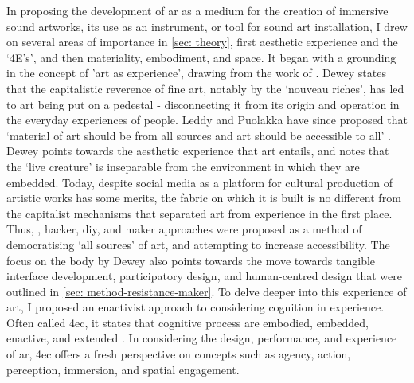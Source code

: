 In proposing the development of \gls{ar} as a medium for the creation of immersive sound artworks, its use as an instrument, or tool for sound art installation, I drew on several areas of importance in \autoref{sec: theory}, first aesthetic experience and the `4E's', and then materiality, embodiment, and space. It began with a grounding in the concept of 'art as experience', drawing from the work of \citep{dewey1934}. Dewey states that the capitalistic reverence of fine art, notably by the `nouveau riches', has led to art being put on a pedestal - disconnecting it from its origin and operation in the everyday experiences of people. Leddy and Puolakka have since proposed that `material of art should be from all sources and art should be accessible to all' \citeyearpar{leddy2021}. Dewey points towards the aesthetic experience that art entails, and notes that the `live creature' is inseparable from the environment in which they are embedded. Today, despite social media as a platform for cultural production of artistic works has some merits, the fabric on which it is built is no different from the capitalist mechanisms that separated art from experience in the first place. Thus, , hacker, \gls{diy}, and maker approaches were proposed as a method of democratising `all sources' of art, and attempting to increase accessibility. The focus on the body by Dewey also points towards the move towards tangible interface development, participatory design, and human-centred design that were outlined in \autoref{sec: method-resistance-maker}. To delve deeper into this experience of art, I proposed an enactivist approach to considering cognition in experience. Often called \gls{4ec}, it states that cognitive process are embodied, embedded, enactive, and extended \citep{gallagher2017}. In considering the design, performance, and experience of \gls{ar}, \gls{4ec} offers a fresh perspective on concepts such as agency, action, perception, immersion, and spatial engagement.

